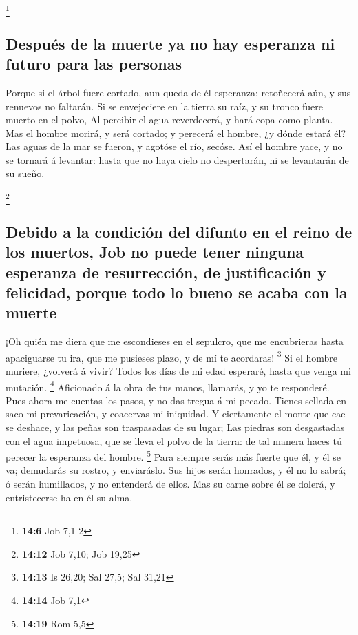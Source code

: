 \footnote{\textbf{14:6} Job 7,1-2}

\hypertarget{despuuxe9s-de-la-muerte-ya-no-hay-esperanza-ni-futuro-para-las-personas}{%
\subsection{Después de la muerte ya no hay esperanza ni futuro para las
personas}\label{despuuxe9s-de-la-muerte-ya-no-hay-esperanza-ni-futuro-para-las-personas}}

 Porque si el árbol fuere cortado, aun queda de él
esperanza; retoñecerá aún, y sus renuevos no faltarán.  Si
se envejeciere en la tierra su raíz, y su tronco fuere muerto en el
polvo,  Al percibir el agua reverdecerá, y hará copa como
planta.  Mas el hombre morirá, y será cortado; y perecerá
el hombre, ¿y dónde estará él?  Las aguas de la mar se
fueron, y agotóse el río, secóse.  Así el hombre yace, y
no se tornará á levantar: hasta que no haya cielo no despertarán, ni se
levantarán de su sueño.

\footnote{\textbf{14:12} Job 7,10; Job 19,25}

\hypertarget{debido-a-la-condiciuxf3n-del-difunto-en-el-reino-de-los-muertos-job-no-puede-tener-ninguna-esperanza-de-resurrecciuxf3n-de-justificaciuxf3n-y-felicidad-porque-todo-lo-bueno-se-acaba-con-la-muerte}{%
\subsection{Debido a la condición del difunto en el reino de los
muertos, Job no puede tener ninguna esperanza de resurrección, de
justificación y felicidad, porque todo lo bueno se acaba con la
muerte}\label{debido-a-la-condiciuxf3n-del-difunto-en-el-reino-de-los-muertos-job-no-puede-tener-ninguna-esperanza-de-resurrecciuxf3n-de-justificaciuxf3n-y-felicidad-porque-todo-lo-bueno-se-acaba-con-la-muerte}}

 ¡Oh quién me diera que me escondieses en el sepulcro,
que me encubrieras hasta apaciguarse tu ira, que me pusieses plazo, y de
mí te acordaras! \footnote{\textbf{14:13} Is 26,20; Sal 27,5; Sal 31,21}
 Si el hombre muriere, ¿volverá á vivir? Todos los días
de mi edad esperaré, hasta que venga mi mutación. \footnote{\textbf{14:14}
  Job 7,1}  Aficionado á la obra de tus manos, llamarás,
y yo te responderé.  Pues ahora me cuentas los pasos, y
no das tregua á mi pecado.  Tienes sellada en saco mi
prevaricación, y coacervas mi iniquidad.  Y ciertamente
el monte que cae se deshace, y las peñas son traspasadas de su lugar;
 Las piedras son desgastadas con el agua impetuosa, que
se lleva el polvo de la tierra: de tal manera haces tú perecer la
esperanza del hombre. \footnote{\textbf{14:19} Rom 5,5} 
Para siempre serás más fuerte que él, y él se va; demudarás su rostro, y
enviaráslo.  Sus hijos serán honrados, y él no lo sabrá;
ó serán humillados, y no entenderá de ellos.  Mas su
carne sobre él se dolerá, y entristecerse ha en él su alma.


